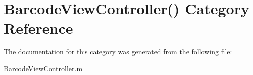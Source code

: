 \hypertarget{category_barcode_view_controller_07_08}{}\section{Barcode\+View\+Controller() Category Reference}
\label{category_barcode_view_controller_07_08}


The documentation for this category was generated from the following file\+:\begin{DoxyCompactItemize}
\item 
Barcode\+View\+Controller.\+m\end{DoxyCompactItemize}
